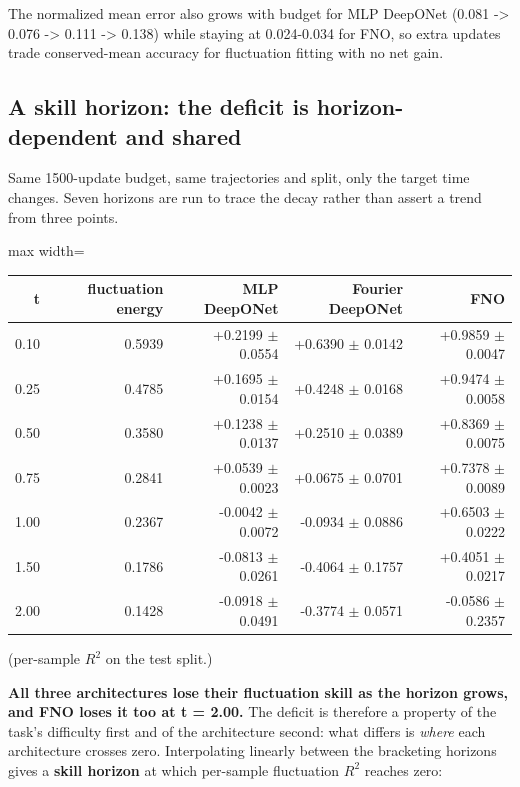 \documentclass[preprint,12pt]{elsarticle}
\begin{document}
The normalized mean error also grows with budget for MLP DeepONet (0.081 -> 0.076 -> 0.111 -> 0.138) while staying at 0.024-0.034 for FNO, so extra updates trade conserved-mean accuracy for fluctuation fitting with no net gain.

\subsection{A skill horizon: the deficit is horizon-dependent and shared}

Same 1500-update budget, same trajectories and split, only the target time changes. Seven horizons are run to trace the decay rather than assert a trend from three points.

\begin{center}
\begin{adjustbox}{max width=\linewidth}
\small
\begin{tabular}{rrrrr}
\toprule
t & fluctuation energy & MLP DeepONet & Fourier DeepONet & FNO \\
\midrule
0.10 & 0.5939 & +0.2199 $\pm$ 0.0554 & +0.6390 $\pm$ 0.0142 & +0.9859 $\pm$ 0.0047 \\
0.25 & 0.4785 & +0.1695 $\pm$ 0.0154 & +0.4248 $\pm$ 0.0168 & +0.9474 $\pm$ 0.0058 \\
0.50 & 0.3580 & +0.1238 $\pm$ 0.0137 & +0.2510 $\pm$ 0.0389 & +0.8369 $\pm$ 0.0075 \\
0.75 & 0.2841 & +0.0539 $\pm$ 0.0023 & +0.0675 $\pm$ 0.0701 & +0.7378 $\pm$ 0.0089 \\
1.00 & 0.2367 & -0.0042 $\pm$ 0.0072 & -0.0934 $\pm$ 0.0886 & +0.6503 $\pm$ 0.0222 \\
1.50 & 0.1786 & -0.0813 $\pm$ 0.0261 & -0.4064 $\pm$ 0.1757 & +0.4051 $\pm$ 0.0217 \\
2.00 & 0.1428 & -0.0918 $\pm$ 0.0491 & -0.3774 $\pm$ 0.0571 & -0.0586 $\pm$ 0.2357 \\
\bottomrule
\end{tabular}
\end{adjustbox}
\end{center}


(per-sample $R^2$ on the test split.)

\textbf{All three architectures lose their fluctuation skill as the horizon grows, and FNO loses it too at t = 2.00.} The deficit is therefore a property of the task's difficulty first and of the architecture second: what differs is \emph{where} each architecture crosses zero. Interpolating linearly between the bracketing horizons gives a \textbf{skill horizon} at which per-sample fluctuation $R^2$ reaches zero:
\end{document}
